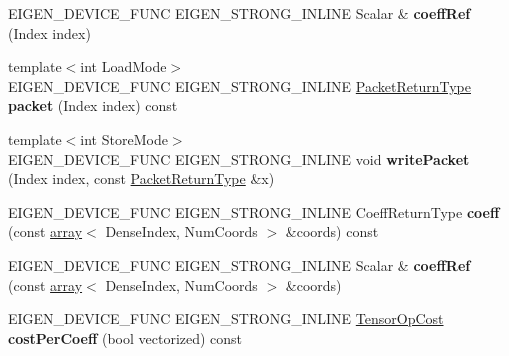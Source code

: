 \begin{DoxyCompactItemize}
E\+I\+G\+E\+N\+\_\+\+D\+E\+V\+I\+C\+E\+\_\+\+F\+U\+NC E\+I\+G\+E\+N\+\_\+\+S\+T\+R\+O\+N\+G\+\_\+\+I\+N\+L\+I\+NE Scalar \& {\bfseries coeff\+Ref} (Index index)
\item 
\mbox{\label{struct_eigen_1_1_tensor_evaluator_af8ba36b08b6aaabc799d5d86a48dcb9d}} 
{\footnotesize template$<$int Load\+Mode$>$ }\\E\+I\+G\+E\+N\+\_\+\+D\+E\+V\+I\+C\+E\+\_\+\+F\+U\+NC E\+I\+G\+E\+N\+\_\+\+S\+T\+R\+O\+N\+G\+\_\+\+I\+N\+L\+I\+NE \hyperlink{group___sparse_core___module}{Packet\+Return\+Type} {\bfseries packet} (Index index) const
\item 
\mbox{\label{struct_eigen_1_1_tensor_evaluator_ab67599edd4fad044494d6043ddc876df}} 
{\footnotesize template$<$int Store\+Mode$>$ }\\E\+I\+G\+E\+N\+\_\+\+D\+E\+V\+I\+C\+E\+\_\+\+F\+U\+NC E\+I\+G\+E\+N\+\_\+\+S\+T\+R\+O\+N\+G\+\_\+\+I\+N\+L\+I\+NE void {\bfseries write\+Packet} (Index index, const \hyperlink{group___sparse_core___module}{Packet\+Return\+Type} \&x)
\item 
\mbox{\label{struct_eigen_1_1_tensor_evaluator_aefd30945bf0ff3afa451a750bcd10158}} 
E\+I\+G\+E\+N\+\_\+\+D\+E\+V\+I\+C\+E\+\_\+\+F\+U\+NC E\+I\+G\+E\+N\+\_\+\+S\+T\+R\+O\+N\+G\+\_\+\+I\+N\+L\+I\+NE Coeff\+Return\+Type {\bfseries coeff} (const \hyperlink{class_eigen_1_1array}{array}$<$ Dense\+Index, Num\+Coords $>$ \&coords) const
\item 
\mbox{\label{struct_eigen_1_1_tensor_evaluator_a78e691c3a908d98afe75f3d9b1101669}} 
E\+I\+G\+E\+N\+\_\+\+D\+E\+V\+I\+C\+E\+\_\+\+F\+U\+NC E\+I\+G\+E\+N\+\_\+\+S\+T\+R\+O\+N\+G\+\_\+\+I\+N\+L\+I\+NE Scalar \& {\bfseries coeff\+Ref} (const \hyperlink{class_eigen_1_1array}{array}$<$ Dense\+Index, Num\+Coords $>$ \&coords)
\item 
\mbox{\label{struct_eigen_1_1_tensor_evaluator_af3251d42e115c7c14f7c82a68a3b799d}} 
E\+I\+G\+E\+N\+\_\+\+D\+E\+V\+I\+C\+E\+\_\+\+F\+U\+NC E\+I\+G\+E\+N\+\_\+\+S\+T\+R\+O\+N\+G\+\_\+\+I\+N\+L\+I\+NE \hyperlink{class_eigen_1_1_tensor_op_cost}{Tensor\+Op\+Cost} {\bfseries cost\+Per\+Coeff} (bool vectorized) const
\item 

\end{DoxyCompactItemize}
